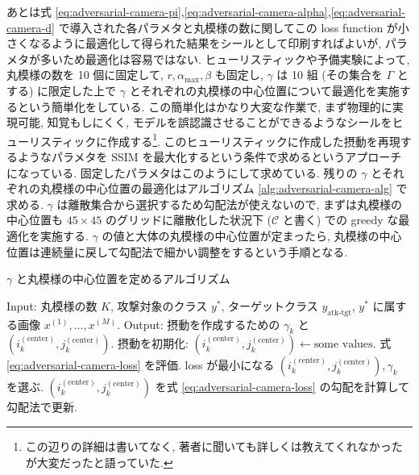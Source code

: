あとは式 \ref{eq:adversarial-camera-pi},\ref{eq:adversarial-camera-alpha},\ref{eq:adversarial-camera-d} で導入された各パラメタと丸模様の数に関してこの loss function が小さくなるように最適化して得られた結果をシールとして印刷すればよいが, パラメタが多いため最適化は容易ではない.
ヒューリスティックや予備実験によって, 丸模様の数を 10 個に固定して, $r, \alpha_{\text{max}}, \beta$ も固定し, $\gamma$ は 10 組 (その集合を $\Gamma$ とする) に限定した上で $\gamma$ とそれぞれの丸模様の中心位置について最適化を実施するという簡単化をしている.
この簡単化はかなり大変な作業で, まず物理的に実現可能, 知覚もしにくく, モデルを誤認識させることができるようなシールをヒューリスティックに作成する\footnote{
この辺りの詳細は書いてなく, 著者に聞いても詳しくは教えてくれなかったが大変だったと語っていた.
}.
このヒューリスティックに作成した摂動を再現するようなパラメタを SSIM \cite{wang2004image} を最大化するという条件で求めるというアプローチになっている.
固定したパラメタはこのようにして求めている.
残りの $\gamma$ とそれぞれの丸模様の中心位置の最適化はアルゴリズム \ref{alg:adversarial-camera-alg} で求める.
$\gamma$ は離散集合から選択するため勾配法が使えないので, まずは丸模様の中心位置も $45 \times 45$ のグリッドに離散化した状況下 ($\mathcal{C}$ と書く) での greedy な最適化を実施する.
$\gamma$ の値と大体の丸模様の中心位置が定まったら, 丸模様の中心位置は連続量に戻して勾配法で細かい調整をするという手順となる.
%
\begin{algorithm}
\caption{$\gamma$ と丸模様の中心位置を定めるアルゴリズム}
\label{alg:adversarial-camera-alg}
\begin{algorithmic}[1]
    \State Input: 丸模様の数 $K$, 攻撃対象のクラス $y^*$, ターゲットクラス $y_{\text{atk-tgt}}$, $y^*$ に属する画像 $x^{(1)}, \dots, x^{(M)}$.
    \State Output: 摂動を作成するための $\gamma_k$ と $(i^{(\text{center})}_k, j^{(\text{center})}_k)$.
	\State 摂動を初期化: $(i^{(\text{center})}_k, j^{(\text{center})}_k) \leftarrow \text{some values}$.
	\Repeat
	\State 式 \ref{eq:adversarial-camera-loss} を評価.
	\EndFor
	\State loss が最小になる $(i^{(\text{center})}_k, j^{(\text{center})}_k), \gamma_k$ を選ぶ.
	\EndFor
	\State
	\Repeat
	\State $(i^{(\text{center})}_k, j^{(\text{center})}_k)$ を式 \ref{eq:adversarial-camera-loss} の勾配を計算して勾配法で更新.
	\EndFor
\end{algorithmic} 
\end{algorithm} 
%

